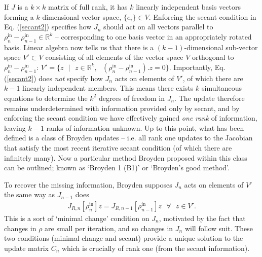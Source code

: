If $J$ is a $k \times k$ matrix of full rank, it has $k$ linearly independent basis vectors forming a $k$-dimensional vector space, $\{ e_i \} \in V$. Enforcing the secant condition in Eq$.$ (\ref{secant2}) specifies how $J_n$ should act on all vectors parallel to $\rho^{\text{in}}_{n} - \rho^{\text{in}}_{n-1} \in \mathbb{R}^k$ -- corresponding to one basis vector in an appropriately rotated basis. Linear algebra now tells us that there is a $(k-1)$-dimensional sub-vector space $V' \subset V$ consisting of all elements of the vector space $V$ orthogonal to $\rho^{\text{in}}_{n} - \rho^{\text{in}}_{n-1}$:  $ V' = \{ z \text{ } | \text{ } z \in \mathbb{R}^k, \text{ } (\rho^{\text{in}}_{n} - \rho^{\text{in}}_{n-1}) . z = 0 \}$. Importantly, Eq$.$ (\ref{secant2}) does \textit{not} specify how $J_n$ acts on elements of $V'$, of which there are $k-1$ linearly independent members. This means there exists $k$ simultaneous equations to determine the $k^2$ degrees of freedom in $J_n$. The update therefore remains underdetermined with information provided only by secant, and by enforcing the secant condition we have effectively gained \textit{one rank} of information, leaving $k-1$ ranks of information unknown. Up to this point, what has been defined is a class of Broyden updates -- i.e. all rank one updates to the Jacobian that satisfy the most recent iterative secant condition (of which there are infinitely many). Now a particular method Broyden proposed within this class can be outlined; known as `Broyden 1 (B1)' or `Broyden's good method'. 

To recover the missing information, Broyden supposes $J_n$ acts on elements of $V'$ the same way as $J_{n-1}$ does
\begin{align}
J_{R,n}[\rho^{\text{in}}_{n}] z = J_{R,n-1}[\rho^{\text{in}}_{n-1}] z \text{ } \forall \text{ } z \in V'.
\end{align}
This is a sort of `minimal change' condition on $J_n$, motivated by the fact that changes in $\rho$ are small per iteration, and so changes in $J_n$ will follow suit. These two conditions (minimal change and secant) provide a unique solution to the update matrix $C_n$ which is crucially of rank one (from the secant information). 

